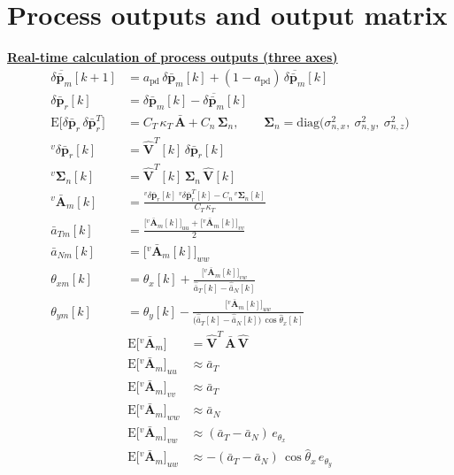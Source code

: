 \documentclass[11pt,a4paper]{ctexart}
\newcommand{\hd}[1]{\par\bigskip\noindent\underline{\textbf{#1}}}
\newcommand{\dpb}{\delta\bar{\mathbf p}}
\newcommand{\Ab}{\bar{\mathbf A}}
\newcommand{\aT}{\bar a_T}
\newcommand{\aN}{\bar a_N}
\newcommand{\haT}{\hat{\bar a}_T}
\newcommand{\haN}{\hat{\bar a}_N}
\newcommand{\cxh}{\cos\hat\theta_x}
\newcommand{\Sn}{\boldsymbol\Sigma_n}
\newcommand{\CK}{C_T\,\kappa_T}
\newcommand{\E}{\mathrm{E}}
\newcommand{\Vh}{\hat{\mathbf V}}
\newcommand{\vAm}{{}^{v}\!\bar{\mathbf A}_m}
\begin{document}
\clearpage
\section{Process outputs and output matrix}
\hd{Real-time calculation of process outputs (three axes)}
\begin{align*}
\overline{\dpb_m}[k+1] &= a_{\mathrm{pd}}\,\dpb_m[k] + (1 - a_{\mathrm{pd}})\,\overline{\dpb_m}[k] \\
\dpb_r[k] &= \dpb_m[k] - \overline{\dpb_m}[k] \\
\E\big[\dpb_r\,\dpb_r^{T}\big] &= \CK\,\Ab + C_n\,\Sn, \qquad \Sn = \mathrm{diag}\big(\sigma_{n,x}^2,\ \sigma_{n,y}^2,\ \sigma_{n,z}^2\big) \\
{}^{v}\dpb_r[k] &= \Vh^{T}[k]\,\dpb_r[k] \\
{}^{v}\Sn[k] &= \Vh^{T}[k]\,\Sn\,\Vh[k] \\
\vAm[k] &= \frac{{}^{v}\dpb_r[k]\;{}^{v}\dpb_r^{T}[k] - C_n\,{}^{v}\Sn[k]}{\CK} \\
\bar a_{Tm}[k] &= \frac{\big[\vAm[k]\big]_{uu} + \big[\vAm[k]\big]_{vv}}{2} \\
\bar a_{Nm}[k] &= \big[\vAm[k]\big]_{ww} \\
\theta_{xm}[k] &= \hat\theta_x[k] + \frac{\big[\vAm[k]\big]_{vw}}{\haT[k] - \haN[k]} \\
\theta_{ym}[k] &= \hat\theta_y[k] - \frac{\big[\vAm[k]\big]_{uw}}{\big(\haT[k] - \haN[k]\big)\,\cxh[k]}
\end{align*}
\begin{align*}
\E\big[\vAm\big] &= \Vh^{T}\,\Ab\,\Vh \\
\E\big[\vAm\big]_{uu} &\approx \aT \\
\E\big[\vAm\big]_{vv} &\approx \aT \\
\E\big[\vAm\big]_{ww} &\approx \aN \\
\E\big[\vAm\big]_{vw} &\approx (\aT - \aN)\,e_{\theta_x} \\
\E\big[\vAm\big]_{uw} &\approx -(\aT - \aN)\,\cxh\,e_{\theta_y}
\end{align*}
\end{document}
